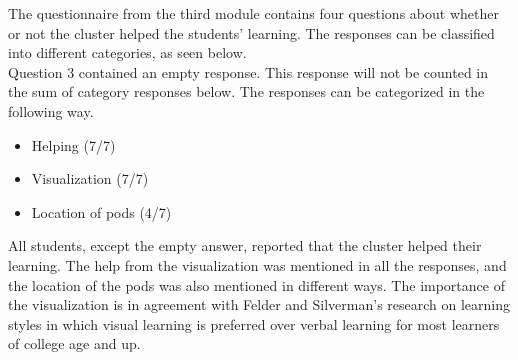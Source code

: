 The questionnaire from the third module contains four questions about whether or not the cluster helped the students’ learning. The responses can be classified into different categories, as seen below. \\

\noindent Question 3 contained an empty response. This response will not be counted in the sum of category responses below. The responses can be categorized in the following way.

\begin{itemize}
	\item Helping (7/7)
	\item Visualization (7/7)
	\item Location of pods (4/7)
\end{itemize}

\noindent
All students, except the empty answer, reported that the cluster helped their learning. The help from the visualization was mentioned in all the responses, and the location of the pods was also mentioned in different ways. The importance of the visualization is in agreement with Felder and Silverman's research on learning styles in which visual learning is preferred over verbal learning for most learners of college age and up.

